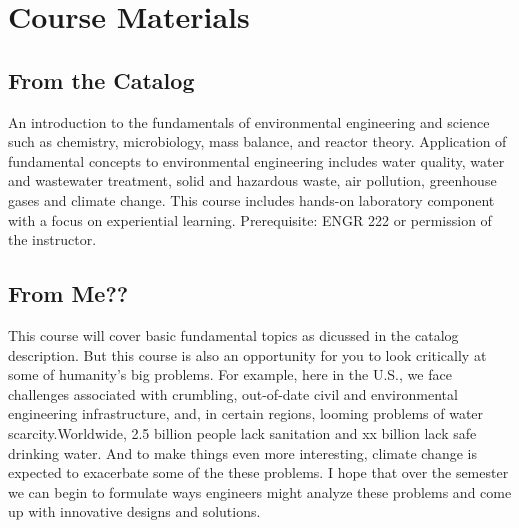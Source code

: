 \documentclass[a4paper, 12pt]{article}
\begin{document}
\section *{Course Materials}
\subsection *{From the Catalog}
An introduction to the fundamentals of environmental engineering and science such as chemistry, microbiology, mass balance, and reactor theory. Application of fundamental concepts to environmental engineering includes water quality, water and wastewater treatment, solid and hazardous waste, air pollution, greenhouse gases and climate change. This course includes hands-on laboratory component with a focus on experiential learning. Prerequisite: ENGR 222 or permission of the instructor.
\subsection *{From Me??}
This course will cover basic fundamental topics as dicussed in the catalog description.  But this course is also an opportunity for you to look critically at some of humanity's big problems.  For example, here in the U.S., we face challenges associated with crumbling, out-of-date civil and environmental engineering infrastructure, and, in certain regions, looming problems of water scarcity.Worldwide, 2.5 billion people lack sanitation and xx billion lack safe drinking water.  And to make things even more interesting, climate change is expected to exacerbate some of the these problems.  I hope that over the semester we can begin to formulate ways engineers might analyze these problems and come up with innovative designs and solutions.  







\end{document}
